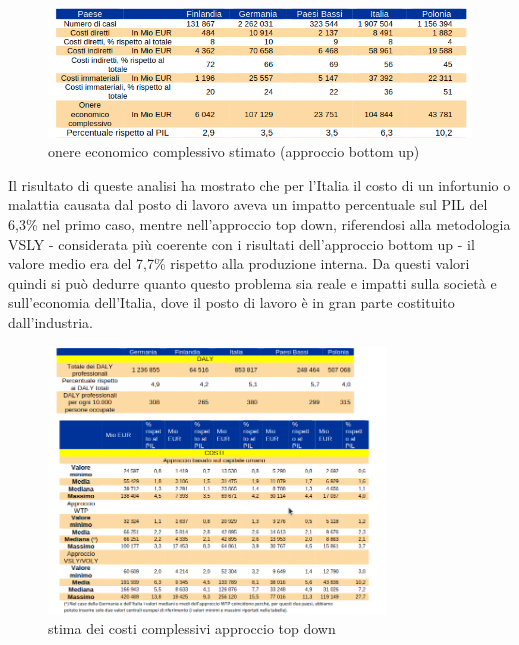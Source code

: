 \vspace{0,5cm}
\begin{figure}[htbp]
    \centering
    \includegraphics[width=\textwidth]{figures/onere_infortuni_ba.png}
    \caption{onere economico complessivo stimato (approccio bottom up)}
    \label{fig:osha_table1}
\end{figure}
\vspace{0,5cm} 

\noindent Il risultato di queste analisi ha mostrato che per l'Italia il costo di un infortunio o malattia causata dal posto di lavoro aveva un impatto percentuale sul PIL del 6,3\% nel primo caso, mentre nell'approccio top down, riferendosi alla metodologia VSLY - considerata più coerente con i risultati dell'approccio bottom up - il valore medio era del 7,7\% rispetto alla produzione interna. Da questi valori quindi si può dedurre quanto questo problema sia reale e impatti sulla società e sull'economia dell'Italia, dove il posto di lavoro è in gran parte costituito dall'industria. 
 
\begin{figure}[H]
    \centering
    \includegraphics[width=0.8\textwidth]{figures/onere_infortuni_td.png}
    \caption{stima dei costi complessivi approccio top down}
    \label{fig:osha_table2}
\end{figure} 

